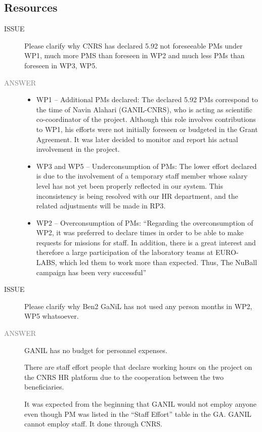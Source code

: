 \begin{prtwo}
\subsection*{Resources}
\begin{description}
\item[ISSUE] Please clarify why CNRS has declared 5.92 not foreseeable PMs under WP1, much more PMS than foreseen in WP2 and much less PMs than foreseen in WP3, WP5.
\item[\textcolor{gray}{ANSWER}] \leavevmode
\begin{itemize}
    \item WP1 – Additional PMs declared: The declared 5.92 PMs correspond to the time of Navin Alahari (GANIL-CNRS), who is acting as scientific co-coordinator of the project. Although this role involves contributions to WP1, his efforts were not initially foreseen or budgeted in the Grant Agreement. It was later decided to monitor and report his actual involvement in the project.
    \item WP3 and WP5 – Underconsumption of PMs: The lower effort declared is due to the involvement of a temporary staff member whose salary level has not yet been properly reflected in our system. This inconsistency is being resolved with our HR department, and the related adjustments will be made in RP3.
    \item WP2 – Overconsumption of PMs: “Regarding the overconsumption of WP2, it was preferred to declare times in order to be able to make requests for missions for staff. In addition, there is a great interest and therefore a large participation of the laboratory teams at EURO-LABS, which led them to work more than expected. Thus, The NuBall campaign has been very successful”
\end{itemize}

\item[ISSUE] Please clarify why Ben2 GaNiL has not used any person months in WP2, WP5 whatsoever. 
\item[\textcolor{gray}{ANSWER}] GANIL has no budget for personnel expenses.

There are staff effort people that declare working hours on the project on the CNRS HR platform due to the cooperation between the two beneficiaries.

It was expected from the beginning that GANIL would not employ anyone even though PM was listed in the “Staff Effort” table in the GA.  GANIL cannot employ staff. It done through CNRS.


\end{description}
\end{prtwo}
